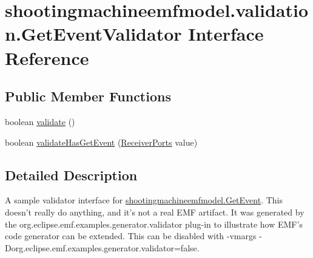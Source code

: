 \hypertarget{interfaceshootingmachineemfmodel_1_1validation_1_1_get_event_validator}{\section{shootingmachineemfmodel.\-validation.\-Get\-Event\-Validator Interface Reference}
\label{interfaceshootingmachineemfmodel_1_1validation_1_1_get_event_validator}
}
\subsection*{Public Member Functions}
\begin{DoxyCompactItemize}
\item 
boolean \hyperlink{interfaceshootingmachineemfmodel_1_1validation_1_1_get_event_validator_a697036ea3825ca06ce7f78d7733886b2}{validate} ()
\item 
boolean \hyperlink{interfaceshootingmachineemfmodel_1_1validation_1_1_get_event_validator_af03b633158739b86c1336557b553dc3a}{validate\-Has\-Get\-Event} (\hyperlink{interfaceshootingmachineemfmodel_1_1_receiver_ports}{Receiver\-Ports} value)
\end{DoxyCompactItemize}


\subsection{Detailed Description}
A sample validator interface for \hyperlink{interfaceshootingmachineemfmodel_1_1_get_event}{shootingmachineemfmodel.\-Get\-Event}. This doesn't really do anything, and it's not a real E\-M\-F artifact. It was generated by the org.\-eclipse.\-emf.\-examples.\-generator.\-validator plug-\/in to illustrate how E\-M\-F's code generator can be extended. This can be disabled with -\/vmargs -\/\-Dorg.\-eclipse.\-emf.\-examples.\-generator.\-validator=false. 

